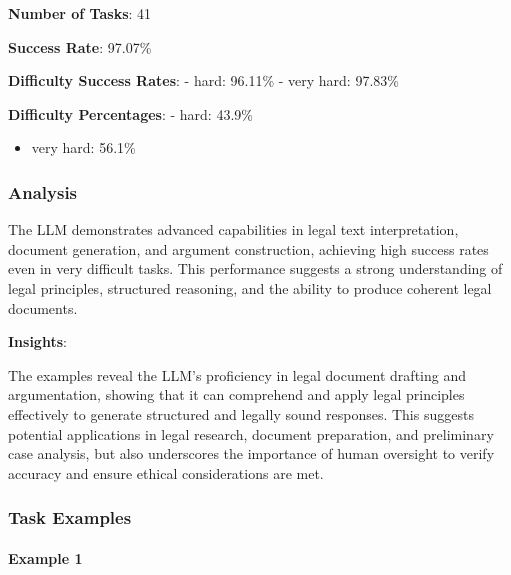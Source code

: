 \documentclass[fleqn,10pt]{wlscirep}
\providecommand{\tightlist}{%
  \setlength{\itemsep}{0pt}\setlength{\parskip}{0pt}}
\begin{document}
\textbf{Number of Tasks}: 41

\textbf{Success Rate}: 97.07\%

\textbf{Difficulty Success Rates}: - hard: 96.11\% - very hard: 97.83\%

\textbf{Difficulty Percentages}: - hard: 43.9\%

\begin{itemize}
\tightlist
\item
  very hard: 56.1\%
\end{itemize}

\hypertarget{analysis-3}{%
\subsubsection{Analysis}\label{analysis-3}}

The LLM demonstrates advanced capabilities in legal text interpretation,
document generation, and argument construction, achieving high success
rates even in very difficult tasks. This performance suggests a strong
understanding of legal principles, structured reasoning, and the ability
to produce coherent legal documents.

\textbf{Insights}:

The examples reveal the LLM's proficiency in legal document drafting and
argumentation, showing that it can comprehend and apply legal principles
effectively to generate structured and legally sound responses. This
suggests potential applications in legal research, document preparation,
and preliminary case analysis, but also underscores the importance of
human oversight to verify accuracy and ensure ethical considerations are
met.

\hypertarget{task-examples-3}{%
\subsubsection{Task Examples}\label{task-examples-3}}

\hypertarget{example-1-3}{%
\paragraph{Example 1}\label{example-1-3}}
\end{document}
